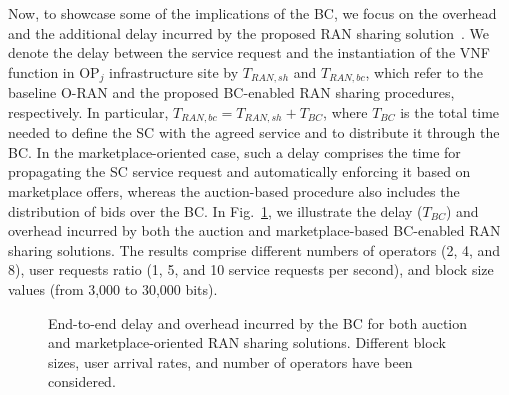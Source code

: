 \documentclass[journal]{IEEEtran}
\begin{document}
Now, to showcase some of the implications of the BC, we focus on the overhead and the additional delay incurred by the proposed RAN sharing solution~\cite{ORAN}. We denote the delay between the service request and the instantiation of the VNF function in OP$_j$ infrastructure site by $T_{RAN,sh}$ and $T_{RAN,bc}$, which refer to the baseline O-RAN and the proposed BC-enabled RAN sharing procedures, respectively. In particular, $T_{RAN,bc}=T_{RAN,sh}+T_{BC}$, where $T_{BC}$ is the total time needed to define the SC with the agreed service and to distribute it through the BC. In the marketplace-oriented case, such a delay comprises the time for propagating the SC service request and automatically enforcing it based on marketplace offers, whereas the auction-based procedure also includes the distribution of bids over the BC. In Fig.~\ref{fig:delay_overhead}, we illustrate the delay ($T_{BC}$) and overhead incurred by both the auction and marketplace-based BC-enabled RAN sharing solutions. The results comprise different numbers of operators (2, 4, and 8), user requests ratio (1, 5, and 10 service requests per second), and block size values (from 3,000 to 30,000 bits).

\begin{figure}[ht!]
\centering
{} 
\caption{End-to-end delay and overhead incurred by the BC for both auction and marketplace-oriented RAN sharing solutions. Different block sizes, user arrival rates, and number of operators have been considered.}
\label{fig:delay_overhead}
\end{figure}
\end{document}
